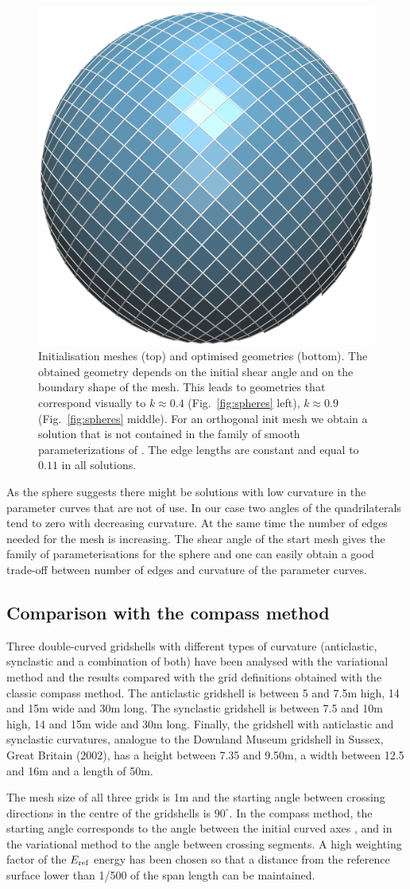 \begin{figure}[ht]
\includegraphics[width=0.32\linewidth]{images/spheres/start0_optimized_new.png}
\caption{Initialisation meshes (top) and optimised geometries (bottom). The obtained geometry depends on the initial shear angle and on the boundary shape of the mesh. This leads to geometries that correspond visually to $k\approx 0.4$ (Fig.~\ref{fig:spheres} left), $k\approx 0.9$ (Fig.~\ref{fig:spheres} middle). For an orthogonal init mesh we obtain a solution that is not contained in the family of smooth parameterizations of \cite{voss}. The edge lengths are constant and equal to $0.11$ in all solutions.}
\label{fig:spheres_optimised}
\end{figure}
As the sphere suggests there might be solutions with low curvature in the parameter curves that are not of use. In our case two angles of the quadrilaterals tend to zero with decreasing curvature. At the same time the number of edges needed for the mesh is increasing. The shear angle of the start mesh gives the family of parameterisations for the sphere and one can easily obtain a good trade-off between number of edges and curvature of the parameter curves.


\subsection{Comparison with the compass method}
Three double-curved gridshells with different types of curvature (anticlastic, synclastic and a combination of both) have been analysed with the variational method and the results compared with the grid definitions obtained with the classic compass method. The anticlastic gridshell is between 5 and 7.5m high, 14 and 15m wide and 30m long. The synclastic gridshell is between 7.5 and 10m high, 14 and 15m wide and 30m long. Finally, the gridshell with anticlastic and synclastic curvatures, analogue to the Downland Museum gridshell in Sussex, Great Britain (2002), has a height between 7.35 and 9.50m, a width between 12.5 and 16m and a length of 50m. 

The mesh size of all three grids is 1m and the starting angle between crossing directions in the centre of the gridshells is $90^\circ$. In the compass method, the starting angle corresponds to the angle between the initial curved axes \cite{IL1974}, and in the variational method to the angle between crossing segments. A high weighting factor of the $E_{\textrm{\scriptsize{ref}}}$ energy has been chosen so that a distance from the reference surface lower than 1/500 of the span length can be maintained.

